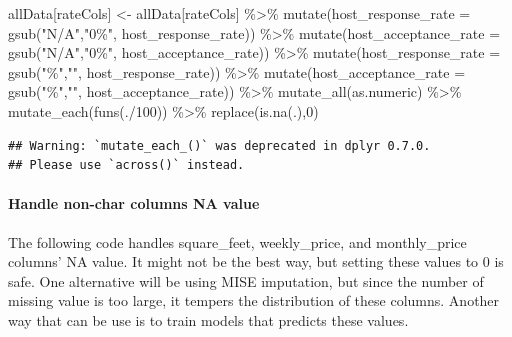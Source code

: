 \documentclass[
]{article}
\newenvironment{Shaded}{\begin{snugshade}}{\end{snugshade}}
\newcommand{\AttributeTok}[1]{\textcolor[rgb]{0.77,0.63,0.00}{#1}}
\newcommand{\DecValTok}[1]{\textcolor[rgb]{0.00,0.00,0.81}{#1}}
\newcommand{\FunctionTok}[1]{\textcolor[rgb]{0.00,0.00,0.00}{#1}}
\newcommand{\NormalTok}[1]{#1}
\newcommand{\OtherTok}[1]{\textcolor[rgb]{0.56,0.35,0.01}{#1}}
\newcommand{\SpecialCharTok}[1]{\textcolor[rgb]{0.00,0.00,0.00}{#1}}
\newcommand{\StringTok}[1]{\textcolor[rgb]{0.31,0.60,0.02}{#1}}
\begin{document}
\begin{Shaded}
\begin{Highlighting}[]
\NormalTok{allData[rateCols] }\OtherTok{\textless{}{-}}\NormalTok{ allData[rateCols] }\SpecialCharTok{\%\textgreater{}\%} 
  \FunctionTok{mutate}\NormalTok{(}\AttributeTok{host\_response\_rate =} \FunctionTok{gsub}\NormalTok{(}\StringTok{"N/A"}\NormalTok{,}\StringTok{"0\%"}\NormalTok{, host\_response\_rate)) }\SpecialCharTok{\%\textgreater{}\%} 
  \FunctionTok{mutate}\NormalTok{(}\AttributeTok{host\_acceptance\_rate =} \FunctionTok{gsub}\NormalTok{(}\StringTok{"N/A"}\NormalTok{,}\StringTok{"0\%"}\NormalTok{, host\_acceptance\_rate)) }\SpecialCharTok{\%\textgreater{}\%} 
  \FunctionTok{mutate}\NormalTok{(}\AttributeTok{host\_response\_rate =} \FunctionTok{gsub}\NormalTok{(}\StringTok{"\%"}\NormalTok{,}\StringTok{""}\NormalTok{, host\_response\_rate)) }\SpecialCharTok{\%\textgreater{}\%} 
  \FunctionTok{mutate}\NormalTok{(}\AttributeTok{host\_acceptance\_rate =} \FunctionTok{gsub}\NormalTok{(}\StringTok{"\%"}\NormalTok{,}\StringTok{""}\NormalTok{, host\_acceptance\_rate)) }\SpecialCharTok{\%\textgreater{}\%} 
  \FunctionTok{mutate\_all}\NormalTok{(as.numeric) }\SpecialCharTok{\%\textgreater{}\%} 
  \FunctionTok{mutate\_each}\NormalTok{(}\FunctionTok{funs}\NormalTok{(.}\SpecialCharTok{/}\DecValTok{100}\NormalTok{)) }\SpecialCharTok{\%\textgreater{}\%} 
  \FunctionTok{replace}\NormalTok{(}\FunctionTok{is.na}\NormalTok{(.),}\DecValTok{0}\NormalTok{)}
\end{Highlighting}
\end{Shaded}

\begin{verbatim}
## Warning: `mutate_each_()` was deprecated in dplyr 0.7.0.
## Please use `across()` instead.
\end{verbatim}

\hypertarget{handle-non-char-columns-na-value}{%
\paragraph{Handle non-char columns NA
value}\label{handle-non-char-columns-na-value}}

The following code handles square\_feet, weekly\_price, and
monthly\_price columns' NA value. It might not be the best way, but
setting these values to 0 is safe. One alternative will be using MISE
imputation, but since the number of missing value is too large, it
tempers the distribution of these columns. Another way that can be use
is to train models that predicts these values.
\end{document}

